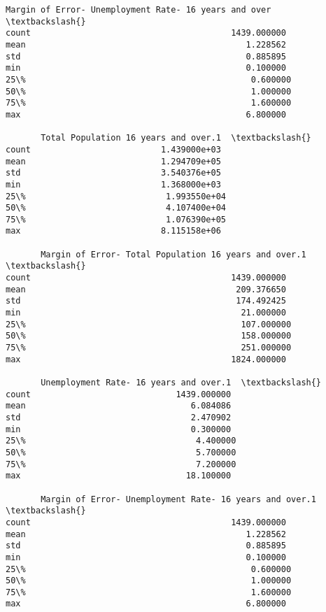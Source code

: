 \documentclass[11pt]{article}
\begin{document}
\begin{tcolorbox}[breakable, size=fbox, boxrule=.5pt, pad at break*=1mm, opacityfill=0]
\begin{Verbatim}[commandchars=\\\{\}]
       Margin of Error- Unemployment Rate- 16 years and over  \textbackslash{}
count                                        1439.000000
mean                                            1.228562
std                                             0.885895
min                                             0.100000
25\%                                             0.600000
50\%                                             1.000000
75\%                                             1.600000
max                                             6.800000

       Total Population 16 years and over.1  \textbackslash{}
count                          1.439000e+03
mean                           1.294709e+05
std                            3.540376e+05
min                            1.368000e+03
25\%                            1.993550e+04
50\%                            4.107400e+04
75\%                            1.076390e+05
max                            8.115158e+06

       Margin of Error- Total Population 16 years and over.1  \textbackslash{}
count                                        1439.000000
mean                                          209.376650
std                                           174.492425
min                                            21.000000
25\%                                           107.000000
50\%                                           158.000000
75\%                                           251.000000
max                                          1824.000000

       Unemployment Rate- 16 years and over.1  \textbackslash{}
count                             1439.000000
mean                                 6.084086
std                                  2.470902
min                                  0.300000
25\%                                  4.400000
50\%                                  5.700000
75\%                                  7.200000
max                                 18.100000

       Margin of Error- Unemployment Rate- 16 years and over.1  \textbackslash{}
count                                        1439.000000
mean                                            1.228562
std                                             0.885895
min                                             0.100000
25\%                                             0.600000
50\%                                             1.000000
75\%                                             1.600000
max                                             6.800000


\end{Verbatim}
\end{tcolorbox}
\end{document}
